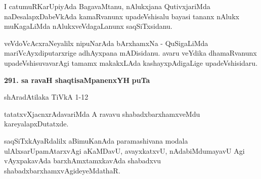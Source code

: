 I catumuRKarUpiyAda BagavaMtanu, nAlukxjana QutivxjariMda naDesalapxDa\-beVkAda kamaR\-vanunx upadeVshisalu bayasi tananx nAlukx muKagaLiMda nAlukxveVda\-gaLanunx saqSiTxsidanu.

veVdoVcAcxraNeyalilx nipuNarAda bArxhamxNa - QuSigaLiMda mariVcAyxdiputarxrige adhAyxpana mADisi\-danu. avaru veYdika dhamaRvanunx upadeVshisuvavarAgi tamamx makakxLAda kashayxpAdigaLige upadeVshisidaru.


\medskip
\noindent
\textbf{291. sa ravaH shaqtisaMpanenxYH} \hfill {\bf puTa \pageref{151}}

\hfill shAradAtilaka TiVkA 1-12

\smallskip
tatatxvXjacnxrAdavariMda A ravavu shabadxbarxhamxveMdu kareyalapxDutatxde.

saqSiTxkAyaRdalilx aBimuKanAda paramashivana modala ulAlxsarUpamAtarx\-vAgi aKaMDavU, avayx\-katxvU, nAdabiMdumayavU Agi vAyxpakavAda barxhAmxtamxka\-vAda shabadxvu shabadxbarxhamxvAgideyeMdathaR.

